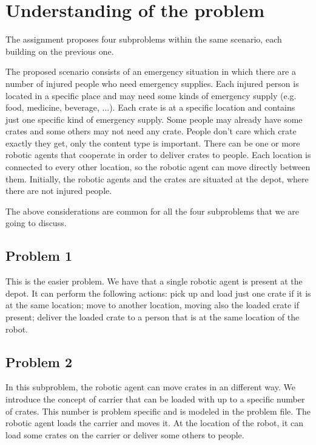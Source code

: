 
\section{Understanding of the problem}
\label{sec2}

The assignment proposes four subproblems within the same scenario, each building on the previous one.

The proposed scenario consists of an emergency situation in which there are a number of injured people 
who need emergency supplies.
Each injured person is located in a specific place and may need some kinds of emergency supply
(e.g. food, medicine, beverage, ...).
Each crate is at a specific location and contains just one specific kind of emergency supply.
Some people may already have some crates and some others may not need any crate.
People don't care which crate exactly they get, only the content type is important.
There can be one or more robotic agents that cooperate in order to deliver crates to people.
Each location is connected to every other location, so the robotic agent can move directly between them.
Initially, the robotic agents and the crates are situated at the depot, where there are not injured people.

The above considerations are common for all the four subproblems that we are going to discuss.

\subsection{Problem 1}
This is the easier problem.
We have that a single robotic agent is present at the depot.
It can perform the following actions: pick up and load just one crate if it is at the same location;
move to another location, moving also the loaded crate if present; 
deliver the loaded crate to a person that is at the same location of the robot.

\subsection{Problem 2}
In this subproblem, the robotic agent can move crates in an different way.
We introduce the concept of carrier that can be loaded with up to a specific number of crates. 
This number is problem specific and is modeled in the problem file.
The robotic agent loads the carrier and moves it. 
At the location of the robot, it can load some crates on the carrier or deliver some others to people.

